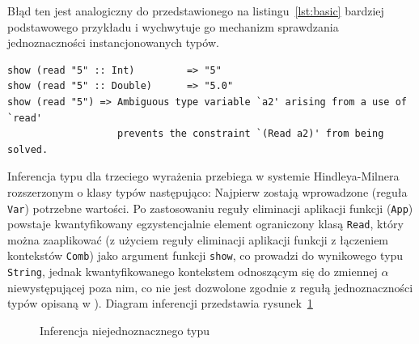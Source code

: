 Błąd ten jest analogiczny do przedstawionego na listingu~\ref{lst:basic} bardziej podstawowego przykładu i wychwytuje go mechanizm sprawdzania jednoznaczności instancjonowanych typów.
\begin{lstlisting}[caption=Podstawowy przykład niejednoznaczności typów, label=lst:basic]
show (read "5" :: Int)         => "5"
show (read "5" :: Double)      => "5.0"
show (read "5") => Ambiguous type variable `a2' arising from a use of `read'
                   prevents the constraint `(Read a2)' from being solved.
\end{lstlisting}

Inferencja typu dla trzeciego wyrażenia przebiega w systemie Hindleya-Milnera \cite{HM} rozszerzonym o klasy typów \cite{TC} następująco: Najpierw zostają wprowadzone (reguła \texttt{Var}) potrzebne wartości. Po zastosowaniu reguły eliminacji aplikacji funkcji (\texttt{App}) powstaje kwantyfikowany egzystencjalnie element ograniczony klasą \texttt{Read}, który można zaaplikować (z użyciem reguły eliminacji aplikacji funkcji z łączeniem kontekstów \texttt{Comb}) jako argument funkcji \texttt{show}, co prowadzi do wynikowego typu \texttt{String}, jednak kwantyfikowanego kontekstem odnoszącym się do zmiennej $\alpha$ niewystępującej poza nim, co nie jest dozwolone zgodnie z regułą jednoznaczności typów opisaną w \cite{Report}). Diagram inferencji przedstawia rysunek~\ref{fig:infer}

\begin{figure}[h]
\scriptsize 
\begin{mdframed}
\begin{prooftree}
 
  
  

\end{prooftree}
\end{mdframed}
\caption{Inferencja niejednoznacznego typu}
\label{fig:infer}
\end{figure}

